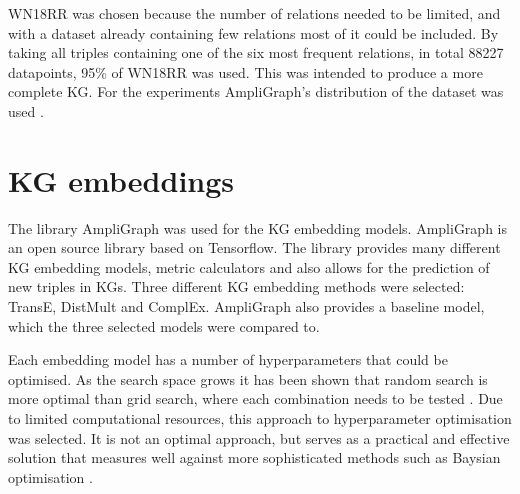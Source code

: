 WN18RR was chosen because the number of relations needed to be limited, and with a dataset already containing few relations most of it could be included. By taking all triples containing one of the six most frequent relations, in total 88227 datapoints, 95\% of WN18RR was used. This was intended to produce a more complete KG. For the experiments AmpliGraph's distribution of the dataset was used \cite{ampligraph}.

\section{KG embeddings}
The library AmpliGraph was used for the KG embedding models. AmpliGraph is an open source library based on Tensorflow. The library provides many different KG embedding models, metric calculators and also allows for the prediction of new triples in KGs. Three different KG embedding methods were selected: TransE, DistMult and ComplEx. AmpliGraph also provides a baseline model, which the three selected models were compared to. 

Each embedding model has a number of hyperparameters that could be optimised. As the search space grows it has been shown that random search is more optimal than grid search, where each combination needs to be tested \cite{bergstra2012random}. Due to limited computational resources, this approach to hyperparameter optimisation was selected. It is not an optimal approach, but serves as a practical and effective solution that measures well against more sophisticated methods such as Baysian optimisation \cite{li2017hyperband}.

